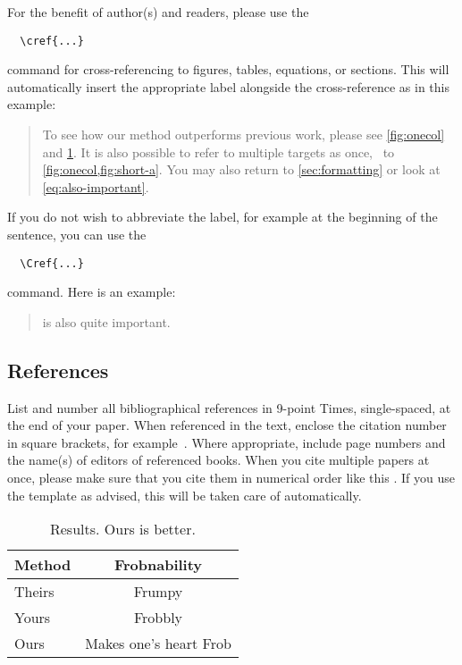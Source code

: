 \documentclass[10pt,twocolumn,letterpaper]{article}
\begin{document}
For the benefit of author(s) and readers, please use the
{\small\begin{verbatim}
  \cref{...}
\end{verbatim}}  command for cross-referencing to figures, tables, equations, or sections.
This will automatically insert the appropriate label alongside the cross-reference as in this example:
\begin{quotation}
  To see how our method outperforms previous work, please see \cref{fig:onecol} and \cref{tab:example}.
  It is also possible to refer to multiple targets as once, \eg~to \cref{fig:onecol,fig:short-a}.
  You may also return to \cref{sec:formatting} or look at \cref{eq:also-important}.
\end{quotation}
If you do not wish to abbreviate the label, for example at the beginning of the sentence, you can use the
{\small\begin{verbatim}
  \Cref{...}
\end{verbatim}}
command. Here is an example:
\begin{quotation}
   is also quite important.
\end{quotation}

\subsection{References}

List and number all bibliographical references in 9-point Times, single-spaced, at the end of your paper.
When referenced in the text, enclose the citation number in square brackets, for
example~\cite{Authors14}.
Where appropriate, include page numbers and the name(s) of editors of referenced books.
When you cite multiple papers at once, please make sure that you cite them in numerical order like this \cite{Alpher02,Alpher03,Alpher05,Authors14b,Authors14}.
If you use the template as advised, this will be taken care of automatically.

\begin{table}
  \centering
  \begin{tabular}{@{}lc@{}}
    \toprule
    Method & Frobnability \\
    \midrule
    Theirs & Frumpy \\
    Yours & Frobbly \\
    Ours & Makes one's heart Frob\\
    \bottomrule
  \end{tabular}
  \caption{Results.   Ours is better.}
  \label{tab:example}
\end{table}
\end{document}
